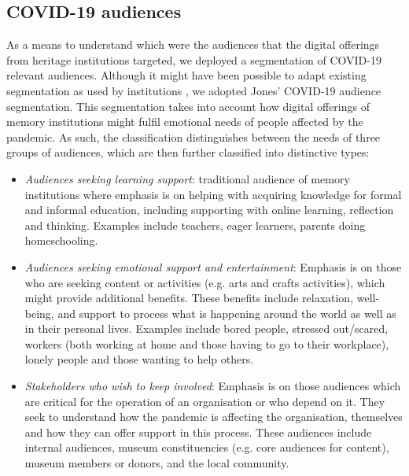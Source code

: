 \documentclass{egpubl}
\begin{document}
\subsection{COVID-19 audiences}
\label{covaud}
As a means to understand which were the audiences that the digital offerings from heritage institutions targeted, we deployed a segmentation of COVID-19 relevant audiences. Although it might have been possible to adapt existing segmentation as used by institutions \cite{Drot19}, we adopted Jones' \cite{Audiences2020} COVID-19 audience segmentation. This segmentation takes into account how digital offerings of memory institutions might fulfil emotional needs of people affected by the pandemic. As such, the classification distinguishes between the needs of three groups of audiences, which are then further classified into distinctive types: 

\begin{itemize}
	\item \textit{Audiences seeking learning support}: traditional audience of memory institutions where emphasis is on helping with acquiring knowledge for formal and informal education, including supporting with online learning, reflection and thinking. Examples include teachers, eager learners, parents doing homeschooling.
	\item \textit{Audiences seeking emotional support and entertainment}: Emphasis is on those who are seeking content or activities (e.g. arts and crafts activities), which might provide additional benefits. These benefits include relaxation, well-being, and support to process what is happening around the world as well as in their personal lives. Examples include bored people, stressed out/scared, workers (both working at home and those having to go to their workplace), lonely people and those wanting to help others. 
	\item \textit{Stakeholders who wish to keep involved}: Emphasis is on those audiences which are critical for the operation of an organisation or who depend on it. They seek to understand how the pandemic is affecting the organisation, themselves and how they can offer support in this process. These audiences include internal audiences, museum constituencies (e.g. core audiences for content), museum members or donors, and the local community.
\end{itemize}
\end{document}
